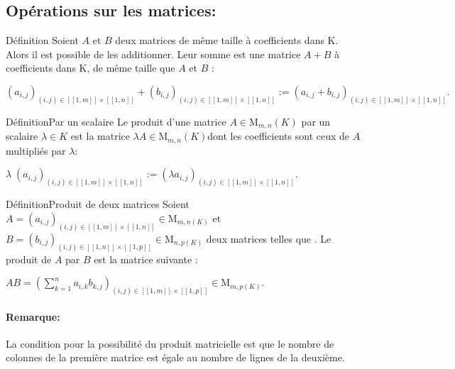 \documentclass{book}
\begin{document}
\subsection{Opérations sur les matrices: }
\begin{Définition}[]{Définition}{}
    Soient ${\displaystyle A}$ et ${\displaystyle B}$ deux matrices de même taille à coefficients dans K. Alors il est possible de les additionner. Leur somme est une matrice ${\displaystyle A+B}$ à coefficients dans K, de même taille que ${\displaystyle A}$ et ${\displaystyle B}$ :

${\displaystyle \left(a_{i,j}\right)_{(i,j)\in \left[\![1,m]\!\right]\times \left[\![1,n]\!\right]}+\left(b_{i,j}\right)_{(i,j)\in \left[\![1,m]\!\right]\times \left[\![1,n]\!\right]}:=\left(a_{i,j}+b_{i,j}\right)_{(i,j)\in \left[\![1,m]\!\right]\times \left[\![1,n]\!\right]}}.$
\end{Définition}
\begin{Définition}[]{Définition}{Par un scalaire}
Le produit d'une matrice ${\displaystyle A\in \mathrm {M} _{m,n}(K)}$ par un scalaire ${\displaystyle \lambda \in K}$ est la matrice ${\displaystyle \lambda A\in \mathrm {M} _{m,n}(K)} $dont les coefficients sont ceux de ${\displaystyle A}$ multipliés par ${\displaystyle \lambda }:$
\begin{center}
${\displaystyle \lambda \;\left(a_{i,j}\right)_{(i,j)\in \left[\![1,m]\!\right]\times \left[\![1,n]\!\right]}:=\left(\lambda a_{i,j}\right)_{(i,j)\in \left[\![1,m]\!\right]\times \left[\![1,n]\!\right]}}.$
\end{center}
\end{Définition}
\begin{Définition}[]{Définition}{Produit de deux matrices}
Soient ${\displaystyle A=\left(a_{i,j}\right)_{(i,j)\in \left[\![1,m]\!\right]\times \left[\![1,n]\!\right]}\in \mathrm {M} _{m,n(K)}}$ et ${\displaystyle B=\left(b_{i,j}\right)_{(i,j)\in \left[\![1,n]\!\right]\times \left[\![1,p]\!\right]}\in \mathrm {M} _{n,p(K)}}$ deux matrices telles que . Le produit de ${\displaystyle A}$ par ${\displaystyle B}$ est la matrice suivante :
\begin{center}
${\displaystyle AB=\left(\sum _{k=1}^{n}a_{i,k}b_{k,j}\right)_{(i,j)\in \left[\![1,m]\!\right]\times \left[\![1,p]\!\right]}\in \mathrm {M} _{m,p(K)}}.$
\end{center}
\end{Définition}
\paragraph{Remarque:}
La condition pour la possibilité du produit matricielle est que le nombre de colonnes de la première matrice est égale au nombre de lignes de la deuxième. 
\end{document}
